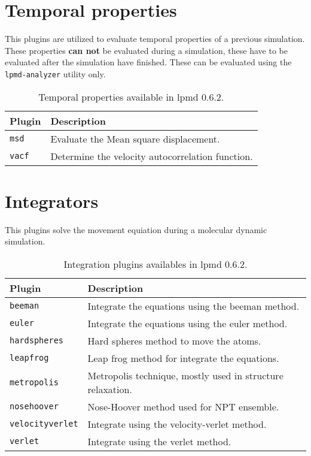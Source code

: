 \section{Temporal properties}
This plugins are utilized to evaluate temporal properties of a previous
simulation. These properties \textbf{can not} be evaluated during a simulation,
these have to be evaluated after the simulation have finished. These can be
evaluated using the \verb|lpmd-analyzer| utility only.

\begin{table}[h!]\centering
 \begin{tabular}{|l|p{13cm}|}\hline
 Plugin & Description \\
 \hline
 \texttt{msd} & Evaluate the Mean square displacement.\\
 \hline
 \texttt{vacf} & Determine the velocity autocorrelation function.\\
 \hline
 \end{tabular}
\label{tab:modtempproper}
\caption{Temporal properties available in lpmd 0.6.2.}
\end{table}

\section{Integrators}
This plugins solve the movement equiation during a molecular dynamic simulation.

\begin{table}[h!]\centering
 \begin{tabular}{|l|p{13cm}|}\hline
 Plugin & Description \\
 \hline\hline
 \texttt{beeman} & Integrate the equations using the beeman method.\\
 \hline
 \texttt{euler} & Integrate the equations using the euler method.\\
 \hline
 \texttt{hardspheres} & Hard spheres method to move the atoms.\\
 \hline
 \texttt{leapfrog} & Leap frog method for integrate the equations.\\
 \hline
 \texttt{metropolis} & Metropolis technique, mostly used in structure
 relaxation.\\
 \hline
 \texttt{nosehoover} & Nose-Hoover method used for NPT ensemble.\\
 \hline
 \texttt{velocityverlet} & Integrate using the velocity-verlet method.\\
 \hline
 \texttt{verlet} & Integrate using the verlet method.\\
 \hline
 \end{tabular}
\label{tab:modinteg}
\caption{Integration plugins availables in lpmd 0.6.2.}
\end{table}

